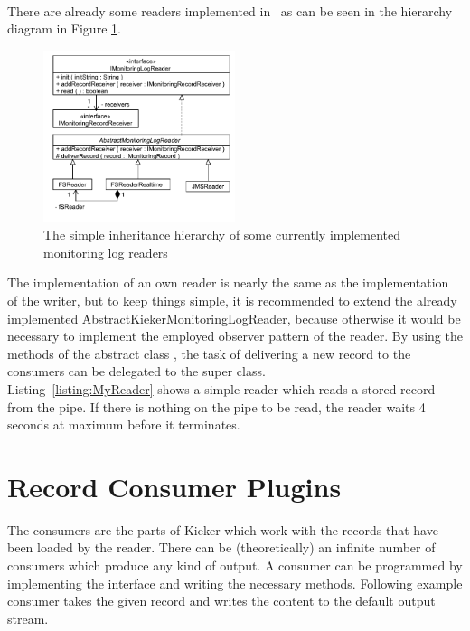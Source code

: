 \

\noindent There are already some readers implemented in \Kieker\  as can be seen in the hierarchy diagram in Figure \ref{Figure:ReaderHierarchy}.

\begin{figure}[H]\centering
\includegraphics[width=0.5\textwidth]{images/kieker_readerimpls}
\caption{The simple inheritance hierarchy of some currently implemented monitoring log readers}
\label{Figure:ReaderHierarchy}
\end{figure}

\noindent The implementation of an own reader is nearly the same as the implementation of the writer, but to keep things simple, it is recommended to extend the already implemented AbstractKiekerMonitoringLogReader, because otherwise it would be necessary to implement the employed observer pattern of the reader. By using the methods of the abstract class , the task of delivering a new record to the consumers can be delegated to the super class.\\
Listing~\ref{listing:MyReader} shows a simple reader which reads a stored record from the pipe. If there is nothing on the pipe to be read, the reader waits 4 seconds at maximum before it terminates.

\setJavaCodeListing


\section{Record Consumer Plugins}\label{sec:analysis:consumer}

The consumers are the parts of Kieker which work with the records that have been loaded by the reader. There can be (theoretically) an infinite number of consumers which produce any kind of output. A consumer can be programmed by implementing the interface  and writing the necessary methods. Following example consumer takes the given record and writes the content to the default output stream.

